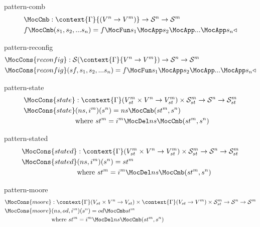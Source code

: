 \documentclass[preview]{standalone}
\begin{document}
\begin{docimage}{pattern-comb}
  \begin{align*}%
    &\MocCmb :
      \context{\Gamma}{({V^n \rightarrow V^m})}
      \rightarrow \mathcal{S}^n \rightarrow \mathcal{S}^m \\
    &f \MocCmb (s_1,s_2,...s_n) =
      f \MocFun s_1 \MocApp s_2 \MocApp ... \MocApp s_n \triangleleft
  \end{align*}
\end{docimage}

\begin{docimage}{pattern-reconfig}
  \begin{align*}%
    & \MocCons{reconfig} :
      \mathcal{S}(\context{\Gamma}{V^n \rightarrow V^m})
      \rightarrow \mathcal{S}^n \rightarrow \mathcal{S}^m \\
    & \MocCons{reconfig}(sf,s_1,s_2,...s_n) =
      f \MocFun s_1 \MocApp s_2 \MocApp ... \MocApp s_n \triangleleft
  \end{align*}
\end{docimage}


\begin{docimage}{pattern-state}
  \begin{align*}%
    \MocCons{state} &:\context{\Gamma}({V^m_{st} \times  V^n \rightarrow V^m_{st}})
                      \times \mathcal{S}^m_{st}
                      \rightarrow \mathcal{S}^n \rightarrow \mathcal{S}^m_{st} \\
    \MocCons{state} &(ns,i^m)(s^n) = ns \MocCmb (st^m, s^n) \\
                    &\text{where}\ st^m = i^m \MocDel ns \MocCmb (st^m, s^n) 
  \end{align*}
\end{docimage}

\begin{docimage}{pattern-stated}
  \begin{align*}%
    \MocCons{stated} &:\context{\Gamma}({V^m_{st} \times  V^n \rightarrow V^m_{st}})
                      \times \mathcal{S}^m_{st}
                      \rightarrow \mathcal{S}^n \rightarrow \mathcal{S}^m_{st} \\
    \MocCons{stated} &(ns,i^m)(s^n) = st^m \\
                    &\text{where}\ st^m = i^m \MocDel ns \MocCmb (st^m, s^n) 
  \end{align*}
\end{docimage}

\begin{docimage}{pattern-moore}
  \begin{align*}%
    \MocCons{moore} &:\context{\Gamma}({V_{st} \times  V^n \rightarrow V_{st}})
                      \times \context{\Gamma}({V_{st} \rightarrow V^m})
                      \times \mathcal{S}^m_{st}
                      \rightarrow \mathcal{S}^n \rightarrow \mathcal{S}^m \\
    \MocCons{moore} &(ns,od,i^m)(s^n) = od \MocCmb st^m \\
                    &\text{where}\ st^m = i^m \MocDel ns \MocCmb (st^m, s^n) 
  \end{align*}
\end{docimage}
\end{document}

